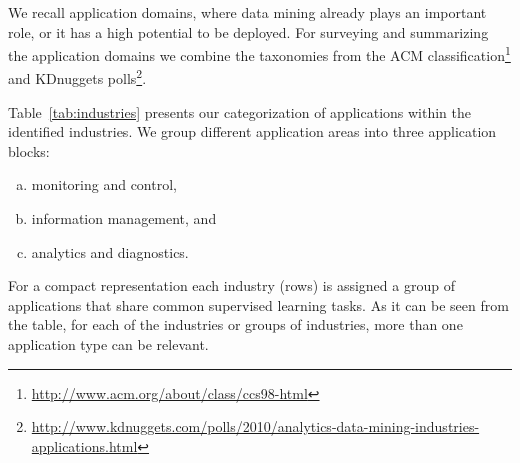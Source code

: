 \documentclass{llncs}
\begin{document}
We recall application domains, where data mining already plays an important role, or it has a high potential to be deployed.
For surveying and summarizing the application domains we combine the taxonomies from the ACM classification\footnote{\url{http://www.acm.org/about/class/ccs98-html}}
and KDnuggets polls\footnote{\url{http://www.kdnuggets.com/polls/2010/analytics-data-mining-industries-applications.html}}.

Table~\ref{tab:industries} presents our categorization of applications within the identified industries.
We group different application areas into three application blocks:
\begin{enumerate}[(a)]
\item monitoring and control,
\item information management, and
\item analytics and diagnostics.
\end{enumerate}
For a compact representation each industry (rows) is assigned a group of applications that share common supervised learning tasks.
As it can be seen from the table, for each of the industries or groups of industries, more than one application type can be relevant.
\end{document}

